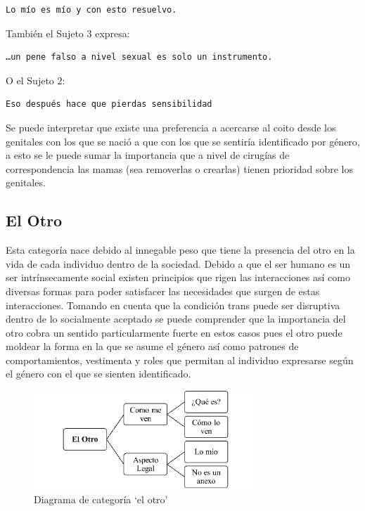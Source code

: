 
\begin{verbatim}
Lo mío es mío y con esto resuelvo.
\end{verbatim}

 También el Sujeto 3 expresa:

 \begin{verbatim}
…un pene falso a nivel sexual es solo un instrumento.
 \end{verbatim}

O el Sujeto 2:

\begin{verbatim}
Eso después hace que pierdas sensibilidad
\end{verbatim}

Se puede interpretar que existe una preferencia a acercarse al coito desde los
genitales con los que se nació a que con los que se sentiría identificado por
género, a esto se le puede sumar la importancia que a nivel de cirugías de
correspondencia las mamas (sea removerlas o crearlas) tienen prioridad sobre los
genitales.

\subsection{El Otro}

Esta categoría nace debido al innegable peso que tiene la presencia del otro en
la vida de cada individuo dentro de la sociedad. Debido a que el ser humano es
un ser intrínsecamente social existen principios que rigen las interacciones así
como diversas formas para poder satisfacer las necesidades que surgen de estas
interacciones. Tomando en cuenta que la condición trans puede ser disruptiva
dentro de lo socialmente aceptado se puede comprender que la importancia del
otro cobra un sentido particularmente fuerte en estos casos pues el otro puede
moldear la forma en la que se asume el género así como patrones de
comportamientos, vestimenta y roles que permitan al individuo expresarse según
el género con el que se sienten identificado.

\begin{figure}
    \centering
    \includegraphics[width=0.75\textwidth]{otro}
    \caption{Diagrama de categoría ‘el otro’}\label{fig:otro}
\end{figure}

